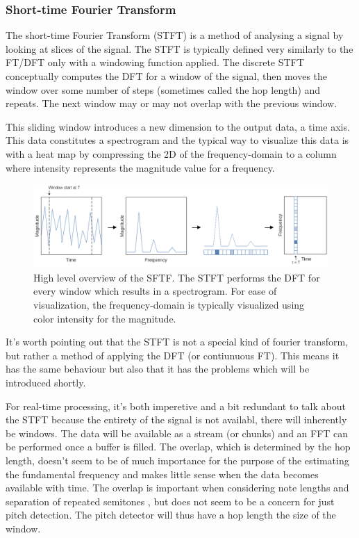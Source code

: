 \subsubsection{Short-time Fourier Transform}
The short-time Fourier Transform (STFT) is a method of analysing a signal by looking at slices of the signal. The STFT is typically defined very similarly to the FT/DFT only with a windowing function applied. The discrete STFT conceptually computes the DFT for a window of the signal, then moves the window over some number of steps (sometimes called the hop length) and repeats. The next window may or may not overlap with the previous window.

This sliding window introduces a new dimension to the output data, a time axis. This data constitutes a spectrogram and the typical way to visualize this data is with a heat map by compressing the 2D of the frequency-domain to a column where intensity represents the magnitude value for a frequency. 

\begin{figure}[ht]
    \centering
    \includegraphics[width=\textwidth]{./images/stft.png}
    \caption{High level overview of the SFTF. The STFT performs the DFT for every window which results in a spectrogram. For ease of visualization, the frequency-domain is typically visualized using color intensity for the magnitude. \label{fig:stft}}
\end{figure}

It's worth pointing out that the STFT is not a special kind of fourier transform, but rather a method of applying the DFT (or contiunuous FT). This means it has the same behaviour but also that it has the problems which will be introduced shortly. 

For real-time processing, it's both imperetive and a bit redundant to talk about the STFT because the entirety of the signal is not availabl, there will inherently be windows. The data will be available as a stream (or chunks) and an FFT can be performed once a buffer is filled. The overlap, which is determined by the hop length, doesn't seem to be of much importance for the purpose of the estimating the fundamental frequency and makes little sense when the data becomes available with time. The overlap is important when considering note lengths and separation of repeated semitones , but does not seem to be a concern for just pitch detection. The pitch detector will thus have a hop length the size of the window.

